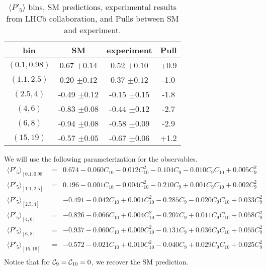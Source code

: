 \documentclass[11pt,amsmath,amssymb]{article}
\newcommand{\Cc}[1]{{\cal C}_{#1}}
\begin{document}
\begin{table}[ht]
\caption{$\langle P'_5 \rangle$ bins, SM predictions, experimental results from LHCb collaboration, and Pulls between SM and experiment.}
\begin{center}
\begin{tabular}{|c|c|c|c|}
\hline
bin & SM & experiment & Pull\\
\hline
$( 0.1,0.98 )$ &   0.67 $\pm 0.14$ & 0.52 $\pm 0.10$ & +0.9\\
$( 1.1, 2.5 )$ &   0.20 $\pm 0.12$ & 0.37 $\pm 0.12$ & -1.0\\
$( 2.5,4 )$ &   -0.49 $\pm 0.12$ & -0.15 $\pm 0.15$ & -1.8\\
$( 4,6 )$ &   -0.83 $\pm 0.08$ & -0.44 $\pm 0.12$ & -2.7\\
$( 6,8 )$ &   -0.94 $\pm 0.08$ & -0.58 $\pm 0.09$ & -2.9\\
$( 15,19 )$ &   -0.57 $\pm 0.05$ & -0.67 $\pm 0.06$ & +1.2\\
\hline
\end{tabular}
\end{center}
\label{p5presults}
\end{table}%

We will use the following parameterization for the observables.
\begin{eqnarray}\nonumber
\langle P'_5 \rangle_{[0.1,0.98]} & = & 0.674 - 0.060 C_{10} - 0.012 C_{10}^2 - 0.104 C_{9} - 0.010 C_{9}C_{10} + 0.005 C_{9}^2 \\ \nonumber
\langle P'_5 \rangle_{[1.1,2.5]} & = & 0.196- 0.001 C_{10} - 0.004 C_{10}^2 - 0.210 C_{9} + 0.001 C_{9}C_{10} + 0.002 C_{9}^2 \\ \nonumber
\langle P'_5 \rangle_{[2.5,4]} & = & -0.491- 0.042 C_{10} + 0.001 C_{10}^2 - 0.285 C_{9} - 0.020 C_{9}C_{10} + 0.033 C_{9}^2 \\ \nonumber
\langle P'_5 \rangle_{[4,6]} & = & -0.826 - 0.066 C_{10} + 0.004 C_{10}^2 - 0.207 C_{9} + 0.011 C_{9}C_{10} + 0.058 C_{9}^2 \\ \nonumber
\langle P'_5 \rangle_{[6,8]} & = & -0.937 - 0.060 C_{10} + 0.009 C_{10}^2 - 0.131 C_{9} + 0.036 C_{9}C_{10} + 0.055 C_{9}^2 \\ \nonumber
\langle P'_5 \rangle_{[15,19]} & = & -0.572 - 0.021 C_{10} + 0.010 C_{10}^2 - 0.040 C_{9} + 0.029 C_{9}C_{10} + 0.025 C_{9}^2 \\ \nonumber
\end{eqnarray}
\noindent
Notice that for $\Cc{9} = \Cc{10} = 0$, we recover the SM prediction.  
  
\end{document}
